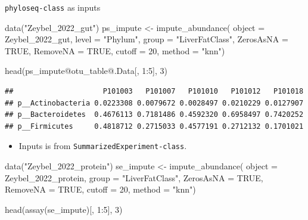 \documentclass[
]{book}
\newenvironment{Shaded}{\begin{snugshade}}{\end{snugshade}}
\newcommand{\AttributeTok}[1]{\textcolor[rgb]{0.77,0.63,0.00}{#1}}
\newcommand{\ConstantTok}[1]{\textcolor[rgb]{0.00,0.00,0.00}{#1}}
\newcommand{\DecValTok}[1]{\textcolor[rgb]{0.00,0.00,0.81}{#1}}
\newcommand{\FunctionTok}[1]{\textcolor[rgb]{0.00,0.00,0.00}{#1}}
\newcommand{\NormalTok}[1]{#1}
\newcommand{\OtherTok}[1]{\textcolor[rgb]{0.56,0.35,0.01}{#1}}
\newcommand{\SpecialCharTok}[1]{\textcolor[rgb]{0.00,0.00,0.00}{#1}}
\newcommand{\StringTok}[1]{\textcolor[rgb]{0.31,0.60,0.02}{#1}}
\providecommand{\tightlist}{%
  \setlength{\itemsep}{0pt}\setlength{\parskip}{0pt}}
\begin{document}
\texttt{phyloseq-class} as inputs

\begin{Shaded}
\begin{Highlighting}[]
\FunctionTok{data}\NormalTok{(}\StringTok{"Zeybel\_2022\_gut"}\NormalTok{)}
\NormalTok{ps\_impute }\OtherTok{\textless{}{-}} \FunctionTok{impute\_abundance}\NormalTok{(}
  \AttributeTok{object =}\NormalTok{ Zeybel\_2022\_gut,}
  \AttributeTok{level =} \StringTok{"Phylum"}\NormalTok{,}
  \AttributeTok{group =} \StringTok{"LiverFatClass"}\NormalTok{,}
  \AttributeTok{ZerosAsNA =} \ConstantTok{TRUE}\NormalTok{,}
  \AttributeTok{RemoveNA =} \ConstantTok{TRUE}\NormalTok{,}
  \AttributeTok{cutoff =} \DecValTok{20}\NormalTok{,}
  \AttributeTok{method =} \StringTok{"knn"}\NormalTok{)}

\FunctionTok{head}\NormalTok{(ps\_impute}\SpecialCharTok{@}\NormalTok{otu\_table}\SpecialCharTok{@}\NormalTok{.Data[, }\DecValTok{1}\SpecialCharTok{:}\DecValTok{5}\NormalTok{], }\DecValTok{3}\NormalTok{)}
\end{Highlighting}
\end{Shaded}

\begin{verbatim}
##                     P101003   P101007   P101010   P101012   P101018
## p__Actinobacteria 0.0223308 0.0079672 0.0028497 0.0210229 0.0127907
## p__Bacteroidetes  0.4676113 0.7181486 0.4592320 0.6958497 0.7420252
## p__Firmicutes     0.4818712 0.2715033 0.4577191 0.2712132 0.1701021
\end{verbatim}

\begin{itemize}
\tightlist
\item
  Inputs is from \texttt{SummarizedExperiment-class}.
\end{itemize}

\begin{Shaded}
\begin{Highlighting}[]
\FunctionTok{data}\NormalTok{(}\StringTok{"Zeybel\_2022\_protein"}\NormalTok{)}
\NormalTok{se\_impute }\OtherTok{\textless{}{-}} \FunctionTok{impute\_abundance}\NormalTok{(}
  \AttributeTok{object =}\NormalTok{ Zeybel\_2022\_protein,}
  \AttributeTok{group =} \StringTok{"LiverFatClass"}\NormalTok{,}
  \AttributeTok{ZerosAsNA =} \ConstantTok{TRUE}\NormalTok{,}
  \AttributeTok{RemoveNA =} \ConstantTok{TRUE}\NormalTok{,}
  \AttributeTok{cutoff =} \DecValTok{20}\NormalTok{,}
  \AttributeTok{method =} \StringTok{"knn"}\NormalTok{)}

\FunctionTok{head}\NormalTok{(}\FunctionTok{assay}\NormalTok{(se\_impute)[, }\DecValTok{1}\SpecialCharTok{:}\DecValTok{5}\NormalTok{], }\DecValTok{3}\NormalTok{)}
\end{Highlighting}
\end{Shaded}
\end{document}
